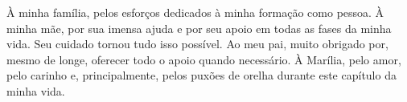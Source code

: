 À minha família, pelos esforços dedicados à minha formação como pessoa. À minha mãe, por sua imensa ajuda e por seu apoio em todas as fases da minha vida. Seu cuidado tornou tudo isso possível. Ao meu pai, muito obrigado por, mesmo de longe, oferecer todo o apoio quando necessário. À Marília, pelo amor, pelo carinho e, principalmente, pelos puxões de orelha durante este capítulo da minha vida.